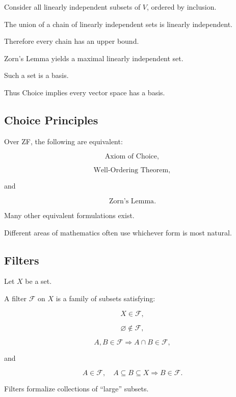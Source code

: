 Consider all linearly independent subsets of \(V\), ordered by inclusion.

The union of a chain of linearly independent sets is linearly independent.

Therefore every chain has an upper bound.

Zorn's Lemma yields a maximal linearly independent set.

Such a set is a basis.

Thus Choice implies every vector space has a basis.

\subsection{Choice Principles}
\label{subsec:choice-principles}

Over ZF, the following are equivalent:

\[
\boxed{
\text{Axiom of Choice},
}
\]

\[
\boxed{
\text{Well-Ordering Theorem},
}
\]

and

\[
\boxed{
\text{Zorn's Lemma}.
}
\]

Many other equivalent formulations exist.

Different areas of mathematics often use whichever form is most natural.

\subsection{Filters}
\label{subsec:set-theoretic-filters}

Let \(X\) be a set.

A filter \(\mathcal{F}\) on \(X\) is a family of subsets satisfying:

\[
\boxed{
X\in\mathcal{F},
}
\]

\[
\boxed{
\varnothing\notin\mathcal{F},
}
\]

\[
A,B\in\mathcal{F}
\Longrightarrow
A\cap B\in\mathcal{F},
\]

and

\[
A\in\mathcal{F},
\quad
A\subseteq B\subseteq X
\Longrightarrow
B\in\mathcal{F}.
\]

Filters formalize collections of ``large'' subsets.

